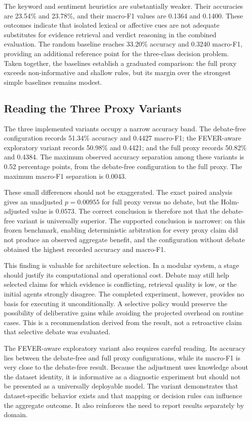 \documentclass[12pt,a4paper,openany]{report}
\begin{document}
The keyword and sentiment heuristics are substantially weaker. Their
accuracies are 23.54\% and 23.78\%, and their macro-F1 values are 0.1364 and
0.1400. These outcomes indicate that isolated lexical or affective cues are
not adequate substitutes for evidence retrieval and verdict reasoning in the
combined evaluation. The random baseline reaches 33.20\% accuracy and 0.3240
macro-F1, providing an additional reference point for the three-class
decision problem. Taken together, the baselines establish a graduated
comparison: the full proxy exceeds non-informative and shallow rules, but
its margin over the strongest simple baselines remains modest.

\subsection{Reading the Three Proxy Variants}
The three implemented variants occupy a narrow accuracy band. The
debate-free configuration records 51.34\% accuracy and 0.4427 macro-F1; the
FEVER-aware exploratory variant records 50.98\% and 0.4421; and the full
proxy records 50.82\% and 0.4384. The maximum observed accuracy separation
among these variants is 0.52 percentage points, from the debate-free
configuration to the full proxy. The maximum macro-F1 separation is 0.0043.

These small differences should not be exaggerated. The exact paired analysis
gives an unadjusted $p=0.00955$ for full proxy versus no debate, but the
Holm-adjusted value is $0.0573$. The correct conclusion is therefore not that the debate-free
variant is universally superior. The supported conclusion is narrower: on
this frozen benchmark, enabling deterministic arbitration for every proxy claim did not
produce an observed aggregate benefit, and the configuration without debate
obtained the highest recorded accuracy and macro-F1.

This finding is valuable for architecture selection. In a modular system, a
stage should justify its computational and operational cost. Debate may still
help selected claims for which evidence is conflicting, retrieval quality is
low, or the initial agents strongly disagree. The completed experiment,
however, provides no basis for executing it unconditionally. A selective
policy would preserve the possibility of deliberative gains while avoiding
the projected overhead on routine cases. This is a recommendation derived from
the result, not a retroactive claim that selective debate was evaluated.

The FEVER-aware exploratory variant also requires careful reading. Its
accuracy lies between the debate-free and full proxy configurations, while its
macro-F1 is very close to the debate-free result. Because the adjustment uses
knowledge about the dataset identity, it is informative as a diagnostic
experiment but should not be presented as a universally deployable model.
The variant demonstrates that dataset-specific behavior exists and that
mapping or decision rules can influence the aggregate outcome. It also
reinforces the need to report results separately by domain.
\end{document}
